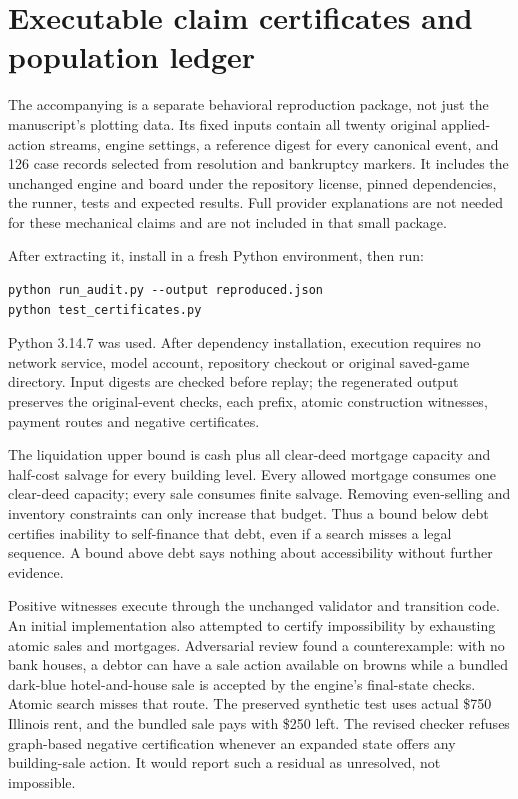 \section{Executable claim certificates and population ledger}
\label{app:certificates}

The accompanying  is a separate behavioral reproduction package, not just the manuscript's plotting data. Its fixed inputs contain all twenty original applied-action streams, engine settings, a reference digest for every canonical event, and 126 case records selected from resolution and bankruptcy markers. It includes the unchanged engine and board under the repository license, pinned dependencies, the runner, tests and expected results. Full provider explanations are not needed for these mechanical claims and are not included in that small package.

After extracting it, install  in a fresh Python environment, then run:
\begin{verbatim}
python run_audit.py --output reproduced.json
python test_certificates.py
\end{verbatim}
Python 3.14.7 was used. After dependency installation, execution requires no network service, model account, repository checkout or original saved-game directory. Input digests are checked before replay; the regenerated output preserves the original-event checks, each prefix, atomic construction witnesses, payment routes and negative certificates.

The liquidation upper bound is cash plus all clear-deed mortgage capacity and half-cost salvage for every building level. Every allowed mortgage consumes one clear-deed capacity; every sale consumes finite salvage. Removing even-selling and inventory constraints can only increase that budget. Thus a bound below debt certifies inability to self-finance that debt, even if a search misses a legal sequence. A bound above debt says nothing about accessibility without further evidence.

Positive witnesses execute through the unchanged validator and transition code. An initial implementation also attempted to certify impossibility by exhausting atomic sales and mortgages. Adversarial review found a counterexample: with no bank houses, a debtor can have a sale action available on browns while a bundled dark-blue hotel-and-house sale is accepted by the engine's final-state checks. Atomic search misses that route. The preserved synthetic test uses actual \$750 Illinois rent, and the bundled sale pays with \$250 left. The revised checker refuses graph-based negative certification whenever an expanded state offers any building-sale action. It would report such a residual as unresolved, not impossible.

